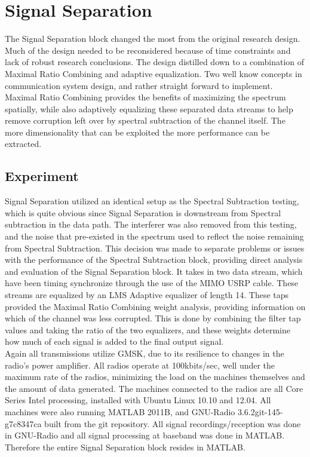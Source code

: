 \section{Signal Separation}

The Signal Separation block changed the most from the original research design.  Much of the design needed to be reconsidered because of time constraints and lack of robust research conclusions.  The design distilled down to a combination of Maximal Ratio Combining and adaptive equalization.  Two well know concepts in communication system design, and rather straight forward to implement.  Maximal Ratio Combining provides the benefits of maximizing the spectrum spatially, while also adaptively equalizing these separated data streams to help remove corruption left over by spectral subtraction of the channel itself.  The more dimensionality that can be exploited the more performance can be extracted.\\

\subsection{Experiment}

Signal Separation utilized an identical setup as the Spectral Subtraction testing, which is quite obvious since Signal Separation is downstream from Spectral subtraction in the data path.  The interferer was also removed from this testing, and the noise that pre-existed in the spectrum used to reflect the noise remaining from Spectral Subtraction.  This decision was made to separate problems or issues with the performance of the Spectral Subtraction block, providing direct analysis and evaluation of the Signal Separation block.  It takes in two data stream, which have been timing synchronize through the use of the MIMO USRP cable.  These streams are equalized by an LMS Adaptive equalizer of length 14.  These taps provided the Maximal Ratio Combining weight analysis, providing information on which of the channel was less corrupted.  This is done by combining the filter tap values and taking the ratio of the two equalizers, and these weights determine how much of each signal is added to the final output signal.\\ 

Again all transmissions utilize GMSK, due to its resilience to changes in the radio's power amplifier.  All radios operate at 100kbits/sec, well under the maximum rate of the radios, minimizing the load on the machines themselves and the amount of data generated.  The machines connected to the radios are all Core Series Intel processing, installed with Ubuntu Linux 10.10 and 12.04.  All machines were also running MATLAB 2011B, and GNU-Radio 3.6.2git-145-g7c8347ca built from the git repository.  All signal recordings/reception was done in GNU-Radio and all signal processing at baseband was done in MATLAB.  Therefore the entire Signal Separation block resides in MATLAB.\\  

